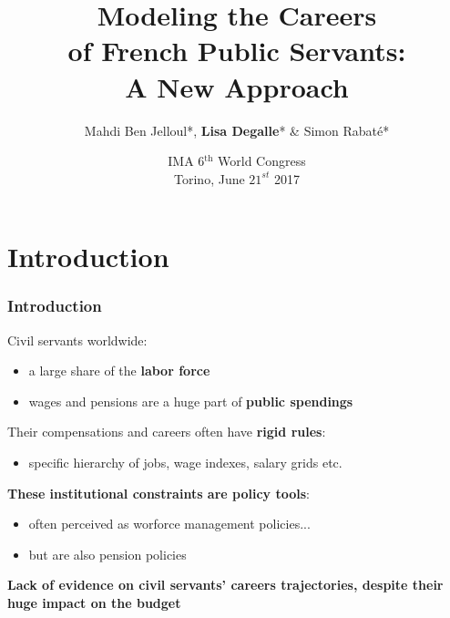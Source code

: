\documentclass[xcolor=table,ignorenonframetext,12pt]{beamer}
\title{Modeling the Careers \\ of French Public Servants: \\ A New Approach}
\author{ Mahdi Ben Jelloul*, \textbf{Lisa Degalle}* \& Simon Rabaté*}
\institute{
  \inst{*} Institut des politiques publiques
}
\date{IMA 6$^{\text{th}}$ World Congress\\
	Torino, June $21^{st}$ 2017}
\newenvironment{choixmarges}[2]{\begin{list}{}{%
\setlength{\topsep}{0pt}%
\setlength{\leftmargin}{0pt}%
\setlength{\rightmargin}{0pt}%
\setlength{\listparindent}{\parindent}%
\setlength{\itemindent}{\parindent}%
\setlength{\parsep}{0pt plus 1pt}%
\addtolength{\leftmargin}{#1}%
\addtolength{\rightmargin}{#2}%
}\item }{\end{list}}
\begin{document}
\frame{\maketitle}




\section{Introduction}


\begin{frame}
\frametitle{Introduction}
\begin{choixmarges}{-0.1cm}{-0.1cm}
	\item Civil servants worldwide:
		\begin{itemize}
		 \item a large share of the \textbf{labor force}
		 \item wages and pensions are a huge part of \textbf{public spendings} 
	\end{itemize}
	\item Their compensations and careers often have \textbf{rigid rules}:
	\begin{itemize}
		\item specific hierarchy of jobs, wage indexes, salary grids etc.
	\end{itemize}
	\item \textbf{These institutional constraints are policy tools}:
	\begin{itemize}
		\item often perceived as worforce management policies...
		\item but are also pension policies
	\end{itemize}
	\bigskip
	\item \textbf{Lack of evidence on civil servants' careers trajectories, despite their huge impact on the budget}
\end{choixmarges}
\end{frame}
\end{document}
